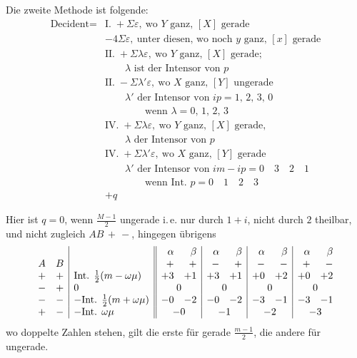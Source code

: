 Die zweite Methode ist folgende:
\[
\begin{aligned}
\text{Decident}={}&\text{I.}\;+\Sigma\varepsilon,\ \text{wo }Y\text{ ganz, }[X]\text{ gerade}\\
&-4\Sigma\varepsilon,\ \text{unter diesen, wo noch }y\text{ ganz, }[x]\text{ gerade}\\
&\text{II.}\;+\Sigma\lambda\varepsilon,\ \text{wo }Y\text{ ganz, }[X]\text{ gerade;}\\
&\qquad\lambda\text{ ist der Intensor von }p\\
&\text{II.}\;-\Sigma\lambda'\varepsilon,\ \text{wo }X\text{ ganz, }[Y]\text{ ungerade}\\
&\qquad\lambda'\text{ der Intensor von }ip=1,\,2,\,3,\,0\\
&\qquad\qquad\text{wenn }\lambda=0,\,1,\,2,\,3\\
&\text{IV.}\;+\Sigma\lambda\varepsilon,\ \text{wo }Y\text{ ganz, }[X]\text{ gerade,}\\
&\qquad\lambda\text{ der Intensor von }p\\
&\text{IV.}\;+\Sigma\lambda'\varepsilon,\ \text{wo }X\text{ ganz, }[Y]\text{ gerade}\\
&\qquad\lambda'\text{ der Intensor von }im-ip=0\quad3\quad2\quad1\\
&\qquad\qquad\text{wenn Int. }p=0\quad1\quad2\quad3\\
&+q
\end{aligned}
\]

Hier ist $q=0$, wenn $\frac{M-1}{2}$ ungerade i.\,e. nur durch $1+i$, nicht durch $2$ theilbar, und nicht zugleich $AB\,+\,-$, hingegen übrigens
\begingroup\small\setlength{\arraycolsep}{2pt}
\[
\begin{array}{cc|l||rr|rr|rr|rr}
&&&\alpha&\beta&\alpha&\beta&\alpha&\beta&\alpha&\beta\\
A&B&&+&+&-&+&-&-&+&-\\
+&+&\text{Int. }\frac12(m-\omega\mu)&+3&+1&+3&+1&+0&+2&+0&+2\\
-&+&0&\multicolumn{2}{c|}{0}&\multicolumn{2}{c|}{0}&\multicolumn{2}{c|}{0}&\multicolumn{2}{c}{0}\\
-&-&-\text{Int. }\frac12(m+\omega\mu)&-0&-2&-0&-2&-3&-1&-3&-1\\
+&-&-\text{Int. }\omega\mu&\multicolumn{2}{c|}{-0}&\multicolumn{2}{c|}{-1}&\multicolumn{2}{c|}{-2}&\multicolumn{2}{c}{-3}
\end{array}
\]
\endgroup
wo doppelte Zahlen stehen, gilt die erste für gerade $\frac{m-1}{2}$, die andere für ungerade.

